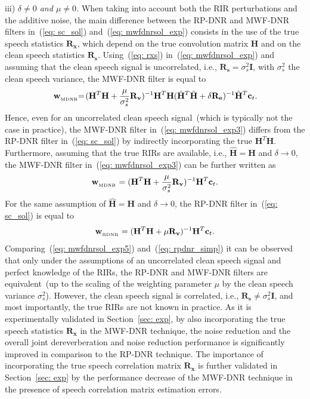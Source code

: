 \documentclass[draftcls,onecolumn,11pt]{IEEEtran}
\begin{document}
iii) {\textit{$\delta \neq 0$ and $\mu \neq 0$.}} \enspace When taking into account both the RIR perturbations and the additive noise, the main difference between the RP-DNR and MWF-DNR filters in~(\ref{eq: sc_sol}) and~(\ref{eq: mwfdnrsol_exp}) consists in the use of the true speech statistics $\mathbf{R}_{\mathbf{x}}$, which depend on the true convolution matrix $\mathbf{H}$ and on the clean speech statistics $\mathbf{R}_{\mathbf{s}}$.
Using~(\ref{eq: rxs}) in~(\ref{eq: mwfdnrsol_exp}) and assuming that the clean speech signal is uncorrelated, i.e., $\mathbf{R}_{\mathbf{s}} = \sigma_s^2\mathbf{I}$, with $\sigma_s^2$ the clean speech variance, the MWF-DNR filter is equal to
\begin{equation}
\label{eq: mwfdnrsol_exp3}
\!\!\mathbf{w}_{_{\rm MDNR}}\!\! = \!( \mathbf{H}^T \mathbf{H} + \frac{\mu}{\sigma_s^2} \mathbf{R}_{\mathbf{v}})^{-1}\mathbf{H}^T \mathbf{H}(\hat{\mathbf{H}}^T\hat{\mathbf{H}}+\delta\mathbf{R}_{\mathbf{e}})^{-1} \hat{\mathbf{H}}^T\mathbf{c}_t. \!\!\!
\end{equation}
Hence, even for an uncorrelated clean speech signal~(which is typically not the case in practice), the MWF-DNR filter in~(\ref{eq: mwfdnrsol_exp3}) differs from the RP-DNR filter in~(\ref{eq: sc_sol}) by indirectly incorporating the true $\mathbf{H}^T\mathbf{H}$.
Furthermore, assuming that the true RIRs are available, i.e., $\mathbf{\hat{H}} = \mathbf{H}$ and $\delta \rightarrow 0$, the MWF-DNR filter in~(\ref{eq: mwfdnrsol_exp3}) can be further written as
\begin{equation}
\label{eq: mwfdnrsol_exp5}
\mathbf{w}_{_{\rm MDNR}} = (\mathbf{H}^T \mathbf{H} + \frac{\mu}{\sigma_s^2} \mathbf{R}_{\mathbf{v}})^{-1} \mathbf{H}^T\mathbf{c}_t.
\end{equation}
For the same assumption of $\hat{\mathbf{H}}=\mathbf{H}$ and $\delta \rightarrow 0$, the RP-DNR filter in~(\ref{eq: sc_sol}) is equal to
\begin{equation}
\label{eq: rpdnr_simp}
\mathbf{w}_{_{\rm RDNR}} = (\mathbf{H}^T \mathbf{H} + \mu \mathbf{R}_{\mathbf{v}})^{-1} \mathbf{H}^T\mathbf{c}_t.
\end{equation}
Comparing~(\ref{eq: mwfdnrsol_exp5}) and~(\ref{eq: rpdnr_simp}) it can be observed that only under the assumptions of an uncorrelated clean speech signal and perfect knowledge of the RIRs, the RP-DNR and MWF-DNR filters are equivalent~(up to the scaling of the weighting parameter $\mu$ by the clean speech variance $\sigma_s^2$).
However, the clean speech signal is correlated, i.e., $\mathbf{R}_{\mathbf{s}} \neq \sigma_s^2 \mathbf{I}$, and most importantly, the true RIRs are not known in practice.
As it is experimentally validated in Section~\ref{sec: exp}, by also incorporating the true speech statistics $\mathbf{R}_{\mathbf{x}}$ in the MWF-DNR technique, the noise reduction and the overall joint dereverberation and noise reduction performance is significantly improved in comparison to the RP-DNR technique.
The importance of incorporating the true speech correlation matrix $\mathbf{R}_{\mathbf{x}}$ is further validated in Section~\ref{sec: exp} by the performance decrease of the MWF-DNR technique in the presence of speech correlation matrix estimation errors.
\end{document}
